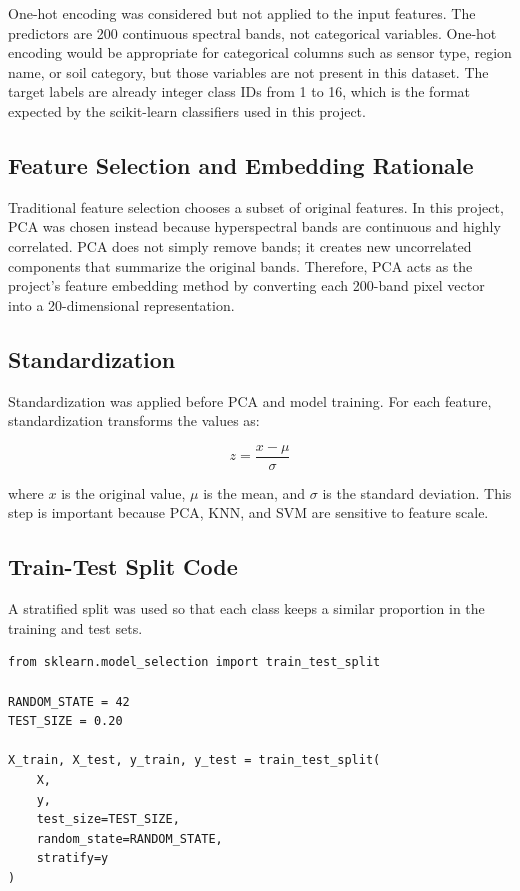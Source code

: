 \documentclass[12pt,a4paper]{article}
\begin{document}
One-hot encoding was considered but not applied to the input features. The predictors are 200 continuous spectral bands, not categorical variables. One-hot encoding would be appropriate for categorical columns such as sensor type, region name, or soil category, but those variables are not present in this dataset. The target labels are already integer class IDs from 1 to 16, which is the format expected by the scikit-learn classifiers used in this project.

\subsection{Feature Selection and Embedding Rationale}

Traditional feature selection chooses a subset of original features. In this project, PCA was chosen instead because hyperspectral bands are continuous and highly correlated. PCA does not simply remove bands; it creates new uncorrelated components that summarize the original bands. Therefore, PCA acts as the project's feature embedding method by converting each 200-band pixel vector into a 20-dimensional representation.

\subsection{Standardization}

Standardization was applied before PCA and model training. For each feature, standardization transforms the values as:

\[
z = \frac{x - \mu}{\sigma}
\]

where $x$ is the original value, $\mu$ is the mean, and $\sigma$ is the standard deviation. This step is important because PCA, KNN, and SVM are sensitive to feature scale.

\subsection{Train-Test Split Code}

A stratified split was used so that each class keeps a similar proportion in the training and test sets.

\begin{lstlisting}
from sklearn.model_selection import train_test_split

RANDOM_STATE = 42
TEST_SIZE = 0.20

X_train, X_test, y_train, y_test = train_test_split(
    X,
    y,
    test_size=TEST_SIZE,
    random_state=RANDOM_STATE,
    stratify=y
)
\end{lstlisting}
\end{document}

